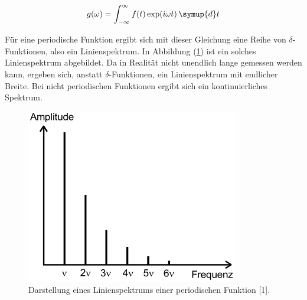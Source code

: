 \begin{equation}
  g(\omega) = \int_{-\infty}^{\infty} f(t) \exp(i\omega t) \, \symup{d}t
  \label{eq:3}
\end{equation}

Für eine periodische Funktion ergibt sich mit dieser Gleichung eine Reihe von
$\delta$-Funktionen, also ein Linienspektrum. In Abbildung (\ref{fig:1}) ist ein
solches Linienspektrum abgebildet. Da in Realität nicht unendlich lange gemessen werden kann,
ergeben sich, anstatt $\delta$-Funktionen, ein Linienspektrum mit endlicher Breite.
Bei nicht periodischen Funktionen ergibt sich ein kontinuierliches Spektrum.

\begin{figure}[H]
  \centering
  \includegraphics{Theorie1.png}
  \caption{Darstellung eines Linienspektrums einer periodischen Funktion [1].}
  \label{fig:1}
\end{figure}
